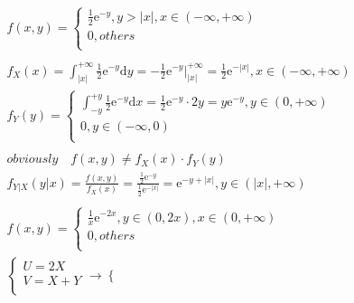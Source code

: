 \documentclass{article}
\begin{document}
\begin{align*}
    f(x,y) = \left\{ 
    \begin{array}{rl} 
        \frac{1}{2}\mathrm{e}^{-y}, y> |x| , x \in (-\infty,+\infty)\\
        0, others \\ 
    \end{array} \right.  \\ \\
    f_{X}(x) = \int_{|x|}^{+\infty} \frac{1}{2}\mathrm{e}^{-y}\mathrm{d}y = -\frac{1}{2}\mathrm{e}^{-y} |_{|x|}^{+\infty} = \frac{1}{2}\mathrm{e}^{-|x|}, x \in (-\infty,+\infty)  \\
    f_{Y}(y) = \left\{ 
    \begin{array}{rl} 
        \int_{-y}^{+y} \frac{1}{2}\mathrm{e}^{-y}\mathrm{d}x = \frac{1}{2}\mathrm{e}^{-y} \cdot 2y = y\mathrm{e}^{-y}, y \in (0,+\infty) \\
        0, y \in (-\infty,0) \\
    \end{array} \right. \ \\ 
    \\
    obviously \quad f(x,y) \neq f_{X}(x) \cdot f_{Y}(y) \\
    f_{Y|X}(y|x) = \frac{f(x,y)}{f_{X}(x)} = \frac{\frac{1}{2}\mathrm{e}^{-y}}{\frac{1}{2}\mathrm{e}^{-|x|}} = \mathrm{e}^{-y+|x|}, y \in (|x|,+\infty)\\
    \\
    f(x,y) = \left\{ 
    \begin{array}{rl} 
        \frac{1}{x}\mathrm{e}^{-2x}, y \in (0,2x), x \in (0,+\infty)\\
        0, others \\ 
    \end{array} \right.  \\
    \left\{
        \begin{array}{rl} 
        U = 2X\\
        V = X+Y \\ 
        \end{array}\right. \rightarrow \left\{
            \begin{array}{rl} 

\end{array}
\end{align*}
\end{document}
